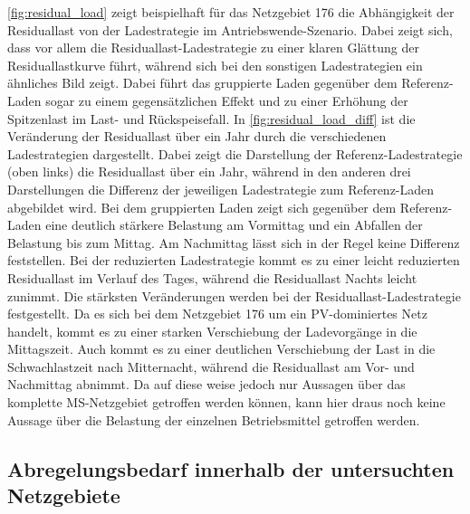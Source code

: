 \autoref{fig:residual_load} zeigt beispielhaft für das Netzgebiet \num{176} die Abhängigkeit der Residuallast von der Ladestrategie im Antriebswende-Szenario.
Dabei zeigt sich, dass vor allem die Residuallast-Ladestrategie zu einer klaren Glättung der Residuallastkurve führt, während sich bei den sonstigen Ladestrategien ein ähnliches Bild zeigt.
Dabei führt das gruppierte Laden gegenüber dem Referenz-Laden sogar zu einem gegensätzlichen Effekt und zu einer Erhöhung der Spitzenlast im Last- und Rückspeisefall.
In \autoref{fig:residual_load_diff} ist die Veränderung der Residuallast über ein Jahr durch die verschiedenen Ladestrategien dargestellt.
Dabei zeigt die Darstellung der Referenz-Ladestrategie (oben links) die Residuallast über ein Jahr, während in den anderen drei Darstellungen die Differenz der jeweiligen Ladestrategie zum Referenz-Laden abgebildet wird.
Bei dem gruppierten Laden zeigt sich gegenüber dem Referenz-Laden eine deutlich stärkere Belastung am Vormittag und ein Abfallen der Belastung bis zum Mittag.
Am Nachmittag lässt sich in der Regel keine Differenz feststellen.
Bei der reduzierten Ladestrategie kommt es zu einer leicht reduzierten Residuallast im Verlauf des Tages, während die Residuallast Nachts leicht zunimmt.
Die stärksten Veränderungen werden bei der Residuallast-Ladestrategie festgestellt.
Da es sich bei dem Netzgebiet \num{176} um ein \gls{PV}-dominiertes Netz handelt, kommt es zu einer starken Verschiebung der Ladevorgänge in die Mittagszeit.
Auch kommt es zu einer deutlichen Verschiebung der Last in die Schwachlastzeit nach Mitternacht, während die Residuallast am Vor- und Nachmittag abnimmt.
Da auf diese weise jedoch nur Aussagen über das komplette \gls{MS}-Netzgebiet getroffen werden können, kann hier draus noch keine Aussage über die Belastung der einzelnen Betriebsmittel getroffen werden.





\subsection{Abregelungsbedarf innerhalb der untersuchten Netzgebiete}

